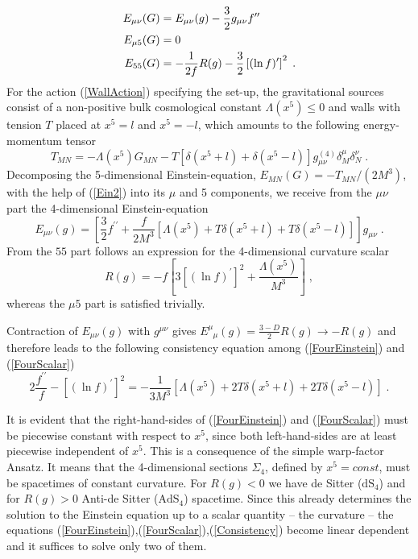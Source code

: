 \documentclass[a4paper,12pt]{article}
\begin{document}
\begin{alignat}{3}
  E_{\mu\nu}(G) &= E_{\mu\nu}(g)-\frac{3}{2}g_{\mu\nu}f^{\prime\prime} 
   \notag \\
  E_{\mu 5}(G) &= 0 
   \label{Ein2} \\
  E_{55}(G) &= -\frac{1}{2f}R(g)
               -\frac{3}{2}\left[(\ln f)^\prime\right]^2 
    \; . \notag
\end{alignat}
For the action (\ref{WallAction}) specifying the set-up, the gravitational
sources consist of a non-positive bulk cosmological constant $\Lambda(x^5) \le
0$ and walls with tension $T$ placed at $x^5=l$ and $x^5=-l$, which amounts to
the following energy-momentum tensor
\begin{equation}
  T_{MN} = -\Lambda(x^5) G_{MN} - T\left[\delta(x^5+l)+\delta(x^5-l)\right]
            g^{(4)}_{\mu\nu}\delta^\mu_M\delta^\nu_N \; .
\end{equation}
Decomposing the 5-dimensional Einstein-equation, $E_{MN}(G)=-T_{MN}/(2M^3)$,
with the help of (\ref{Ein2}) into its $\mu$ and 5 components, we
receive from the $\mu\nu$ part the 4-dimensional Einstein-equation
\begin{equation}
  E_{\mu\nu}(g)=\left[ \frac{3}{2}f^{\prime\prime}+\frac{f}{2M^3}
                       \left[ \Lambda(x^5)+T\delta(x^5+l)+T\delta(x^5-l)
                       \right]
                \right] g_{\mu\nu} \; .
  \label{FourEinstein}
\end{equation}
From the $55$ part follows an expression for the 4-dimensional curvature scalar
\begin{equation}
  R(g)=-f\left[3\left[(\ln f)^\prime\right]^2+\frac{\Lambda(x^5)}{M^3}
         \right] \; ,
  \label{FourScalar}
\end{equation}
whereas the $\mu 5$ part is satisfied trivially.

Contraction of $E_{\mu\nu}(g)$ with $g^{\mu\nu}$ gives
$E^\mu_{\phantom{\mu}\mu}(g)=\frac{3-D}{2} R(g)\rightarrow -R(g)$ and therefore
leads to the following consistency equation among (\ref{FourEinstein}) and
(\ref{FourScalar})
\begin{equation}
    2\frac{f^{\prime\prime}}{f}-\left[(\ln f)^\prime\right]^2
  = -\frac{1}{3M^3}\left[ \Lambda(x^5)+2T\delta(x^5+l)+2T\delta(x^5-l)
                   \right] \; .
    \label{Consistency}
\end{equation} 

It is evident that the right-hand-sides of (\ref{FourEinstein}) and
(\ref{FourScalar}) must be piecewise constant with respect to $x^5$, since
both left-hand-sides are at least piecewise independent of $x^5$.
This is a consequence of the simple warp-factor Ansatz.
It means that the 4-dimensional sections $\Sigma_4$, defined by $x^5=const$,
must be spacetimes of constant curvature. For $R(g)<0$ we have de Sitter
($\text{dS}_4$) and for $R(g)>0$ Anti-de Sitter ($\text{AdS}_4$)
spacetime. Since this already determines the solution to the Einstein equation
up to a scalar quantity -- the curvature -- the equations
(\ref{FourEinstein}),(\ref{FourScalar}),(\ref{Consistency}) become linear
dependent and it suffices to solve only two of them.
\end{document}
